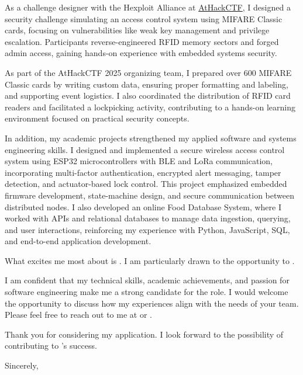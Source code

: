\documentclass[10pt]{article}
\begin{document}
As a challenge designer with the Hexploit Alliance at \href{https://www.athackctf.com}{AtHackCTF}, I designed a security challenge simulating an access control system using MIFARE Classic cards, focusing on vulnerabilities like weak key management and privilege escalation. Participants reverse-engineered RFID memory sectors and forged admin access, gaining hands-on experience with embedded systems security.

As part of the AtHackCTF 2025 organizing team, I prepared over 600 MIFARE Classic cards by writing custom data, ensuring proper formatting and labeling, and supporting event logistics. I also coordinated the distribution of RFID card readers and facilitated a lockpicking activity, contributing to a hands-on learning environment focused on practical security concepts.

In addition, my academic projects strengthened my applied software and systems engineering skills. I designed and implemented a secure wireless access control system using ESP32 microcontrollers with BLE and LoRa communication, incorporating multi-factor authentication, encrypted alert messaging, tamper detection, and actuator-based lock control. This project emphasized embedded firmware development, state-machine design, and secure communication between distributed nodes. I also developed an online Food Database System, where I worked with APIs and relational databases to manage data ingestion, querying, and user interactions, reinforcing my experience with Python, JavaScript, SQL, and end-to-end application development.

What excites me most about \company \space is \companyDetails. I am particularly drawn to the opportunity to \positionDetails.

I am confident that my technical skills, academic achievements, and passion for software engineering make me a strong candidate for the \position \space role. I would welcome the opportunity to discuss how my experiences align with the needs of your team. Please feel free to reach out to me at \href{tel:+15149445977}{\phone} or \href{mailto:\email}{\email}.

\vspace{1.5em}
Thank you for considering my application. I look forward to the possibility of contributing to \company's success.

\vspace{2em}
Sincerely, \\
\fullname
\end{document}
